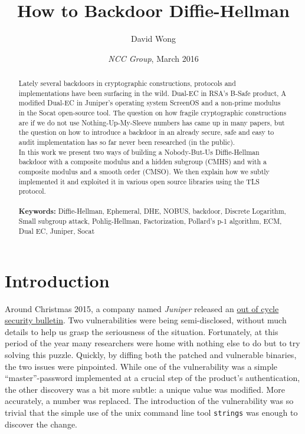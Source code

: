 \documentclass[a4paper,11pt,twocolumn]{article}
\title{How to Backdoor Diffie-Hellman}
\author{David Wong}
\date{\emph{NCC Group}, \small{March 2016}}
\begin{document}
\maketitle
\renewcommand{\abstractname}{Abstract}
\begin{abstract}
Lately several backdoors in cryptographic constructions, protocols and implementations have been surfacing in the wild. Dual-EC in RSA's B-Safe product, A modified Dual-EC in Juniper's operating system ScreenOS and a non-prime modulus in the Socat open-source tool. The question on how fragile cryptographic constructions are if we do not use Nothing-Up-My-Sleeve numbers has came up in many papers, but the question on how to introduce a backdoor in an already secure, safe and easy to audit implementation has so far never been researched (in the public).\\
In this work we present two ways of building a Nobody-But-Us Diffie-Hellman backdoor with a composite modulus and a hidden subgroup (CMHS) and with a composite modulus and a smooth order (CMSO). We then explain how we subtly implemented it and exploited it in various open source libraries using the TLS protocol.\\
\\
\textbf{Keywords:} Diffie-Hellman, Ephemeral, DHE, NOBUS, backdoor, Discrete Logarithm, Small subgroup attack, Pohlig-Hellman, Factorization, Pollard's p-1 algorithm, ECM, Dual EC, Juniper, Socat\\

\end{abstract}
\section{Introduction}\label{introduction}

Around Christmas 2015, a company named \emph{Juniper} released an \href{https://kb.juniper.net/InfoCenter/index?page=content&id=JSA10713&actp=search}{out of cycle security bulletin}. Two vulnerabilities were being semi-disclosed, without much details to help us grasp the seriousness of the situation. Fortunately, at this period of the year many researchers were home with nothing else to do but to try solving this puzzle. Quickly, by diffing both the patched and vulnerable binaries, the two issues were pinpointed. While one of the vulnerability was a simple ``master''-password implemented at a crucial step of the product's authentication, the other discovery was a bit more subtle: a unique value was modified. More accurately, a number was replaced. The introduction of the vulnerability was so trivial that the simple use of the unix command line tool \texttt{strings} was enough to discover the change.
\end{document}
